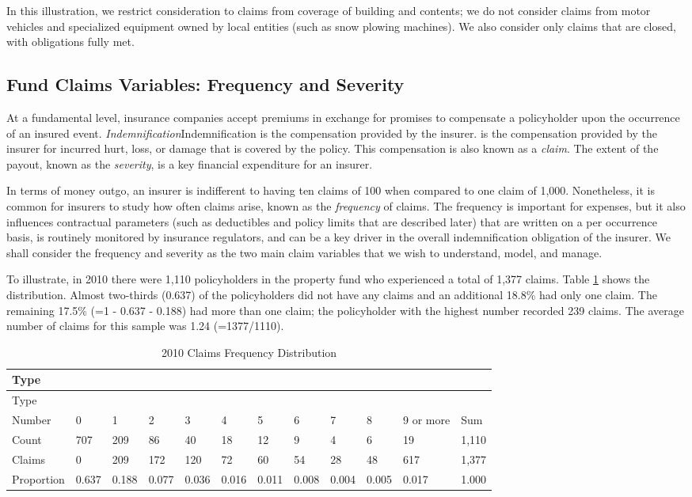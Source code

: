 \documentclass[]{book}
\theoremstyle{definition}
\theoremstyle{definition}
\theoremstyle{definition}
\theoremstyle{remark}
\begin{document}
In this illustration, we restrict consideration to claims from coverage
of building and contents; we do not consider claims from motor vehicles
and specialized equipment owned by local entities (such as snow plowing
machines). We also consider only claims that are closed, with
obligations fully met.

\subsection{Fund Claims Variables: Frequency and
Severity}\label{S:OutComes}

At a fundamental level, insurance companies accept premiums in exchange
for promises to compensate a policyholder upon the occurrence of an
insured event. \emph{Indemnification}{Indemnification is the
compensation provided by the insurer.} is the compensation provided by
the insurer for incurred hurt, loss, or damage that is covered by the
policy. This compensation is also known as a \emph{claim}. The extent of
the payout, known as the \emph{severity}, is a key financial expenditure
for an insurer.

In terms of money outgo, an insurer is indifferent to having ten claims
of 100 when compared to one claim of 1,000. Nonetheless, it is common
for insurers to study how often claims arise, known as the
\emph{frequency} of claims. The frequency is important for expenses, but
it also influences contractual parameters (such as deductibles and
policy limits that are described later) that are written on a per
occurrence basis, is routinely monitored by insurance regulators, and
can be a key driver in the overall indemnification obligation of the
insurer. We shall consider the frequency and severity as the two main
claim variables that we wish to understand, model, and manage.

To illustrate, in 2010 there were 1,110 policyholders in the property
fund who experienced a total of 1,377 claims. Table
\ref{tab:Frequency2010} shows the distribution. Almost two-thirds
(0.637) of the policyholders did not have any claims and an additional
18.8\% had only one claim. The remaining 17.5\% (=1 - 0.637 - 0.188) had
more than one claim; the policyholder with the highest number recorded
239 claims. The average number of claims for this sample was 1.24
(=1377/1110).

\begin{longtable}[]{@{}llllllllllll@{}}
\caption{\label{tab:Frequency2010} 2010 Claims Frequency
Distribution}\tabularnewline
\toprule
Type & & & & & & & & & & &\tabularnewline
\midrule
\endfirsthead
\toprule
Type & & & & & & & & & & &\tabularnewline
\midrule
\endhead
Number & 0 & 1 & 2 & 3 & 4 & 5 & 6 & 7 & 8 & 9 or more &
Sum\tabularnewline
Count & 707 & 209 & 86 & 40 & 18 & 12 & 9 & 4 & 6 & 19 &
1,110\tabularnewline
Claims & 0 & 209 & 172 & 120 & 72 & 60 & 54 & 28 & 48 & 617 &
1,377\tabularnewline
Proportion & 0.637 & 0.188 & 0.077 & 0.036 & 0.016 & 0.011 & 0.008 &
0.004 & 0.005 & 0.017 & 1.000\tabularnewline
\bottomrule
\end{longtable}
\end{document}
